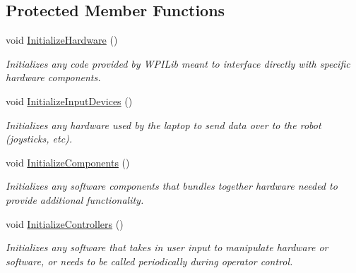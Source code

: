 \subsection*{\-Protected \-Member \-Functions}
\begin{DoxyCompactItemize}
\item 
void \hyperlink{class_prototype_robot_a589a866ea797e4bf9d135e9ef28d22d5}{\-Initialize\-Hardware} ()
\begin{DoxyCompactList}\small\item\em \-Initializes any code provided by \-W\-P\-I\-Lib meant to interface directly with specific hardware components. \end{DoxyCompactList}\item 
void \hyperlink{class_prototype_robot_a185aff067e319ee33d34e09564748f32}{\-Initialize\-Input\-Devices} ()
\begin{DoxyCompactList}\small\item\em \-Initializes any hardware used by the laptop to send data over to the robot (joysticks, etc). \end{DoxyCompactList}\item 
void \hyperlink{class_prototype_robot_a272a6776690860c918d6660552ef29cb}{\-Initialize\-Components} ()
\begin{DoxyCompactList}\small\item\em \-Initializes any software components that bundles together hardware needed to provide additional functionality. \end{DoxyCompactList}\item 
void \hyperlink{class_prototype_robot_af9b3adcf77f9f6781447db830501f42c}{\-Initialize\-Controllers} ()
\begin{DoxyCompactList}\small\item\em \-Initializes any software that takes in user input to manipulate hardware or software, or needs to be called periodically during operator control. \end{DoxyCompactList}\end{DoxyCompactItemize}
